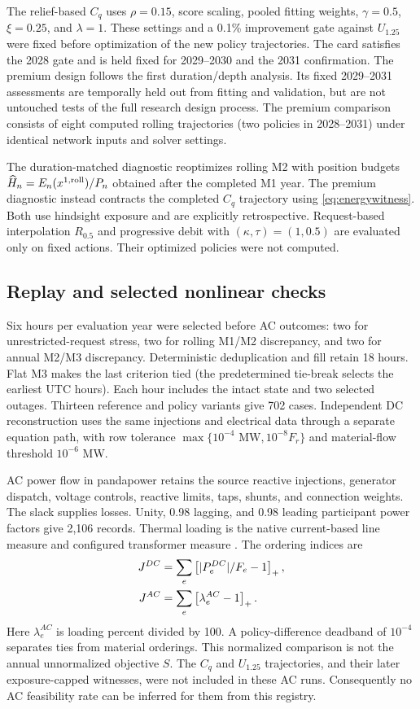 \documentclass[10pt,journal]{IEEEtran}
\newcommand{\pos}[1]{\left[#1\right]_+}
\begin{document}
The relief-based $C_q$ uses $\rho=0.15$, score scaling, pooled fitting weights, $\gamma=0.5$, $\xi=0.25$, and $\lambda=1$. These settings and a 0.1\% improvement gate against $U_{1.25}$ were fixed before optimization of the new policy trajectories. The card satisfies the 2028 gate and is held fixed for 2029--2030 and the 2031 confirmation. The premium design follows the first duration/depth analysis. Its fixed 2029--2031 assessments are temporally held out from fitting and validation, but are not untouched tests of the full research design process. The premium comparison consists of eight computed rolling trajectories (two policies in 2028--2031) under identical network inputs and solver settings.

The duration-matched diagnostic reoptimizes rolling M2 with position budgets $\widehat H_n=E_n(x^{1,\rm roll})/P_n$ obtained after the completed M1 year. The premium diagnostic instead contracts the completed $C_q$ trajectory using \eqref{eq:energywitness}. Both use hindsight exposure and are explicitly retrospective. Request-based interpolation $R_{0.5}$ and progressive debit with $(\kappa,\tau)=(1,0.5)$ are evaluated only on fixed actions. Their optimized policies were not computed.


\subsection{Replay and selected nonlinear checks}
Six hours per evaluation year were selected before AC outcomes: two for unrestricted-request stress, two for rolling M1/M2 discrepancy, and two for annual M2/M3 discrepancy. Deterministic deduplication and fill retain 18 hours. Flat M3 makes the last criterion tied (the predetermined tie-break selects the earliest UTC hours). Each hour includes the intact state and two selected outages. Thirteen reference and policy variants give 702 cases. Independent DC reconstruction uses the same injections and electrical data through a separate equation path, with row tolerance $\max\{10^{-4}\text{ MW},10^{-8}F_r\}$ and material-flow threshold $10^{-6}$ MW.

AC power flow in pandapower \cite{Thurner2018} retains the source reactive injections, generator dispatch, voltage controls, reactive limits, taps, shunts, and connection weights. The slack supplies losses. Unity, 0.98 lagging, and 0.98 leading participant power factors give 2,106 records. Thermal loading is the native current-based line measure and configured transformer measure \cite{PandapowerLoading,PandapowerTransformer}. The ordering indices are
\begin{align}
J^{DC}&=\sum_e\pos{|P_e^{DC}|/F_e-1},\notag\\
J^{AC}&=\sum_e\pos{\lambda_e^{AC}-1}.
\label{eq:J}
\end{align}
Here $\lambda_e^{AC}$ is loading percent divided by 100. A policy-difference deadband of $10^{-4}$ separates ties from material orderings. This normalized comparison is not the annual unnormalized objective $S$. The $C_q$ and $U_{1.25}$ trajectories, and their later exposure-capped witnesses, were not included in these AC runs. Consequently no AC feasibility rate can be inferred for them from this registry.
\end{document}
